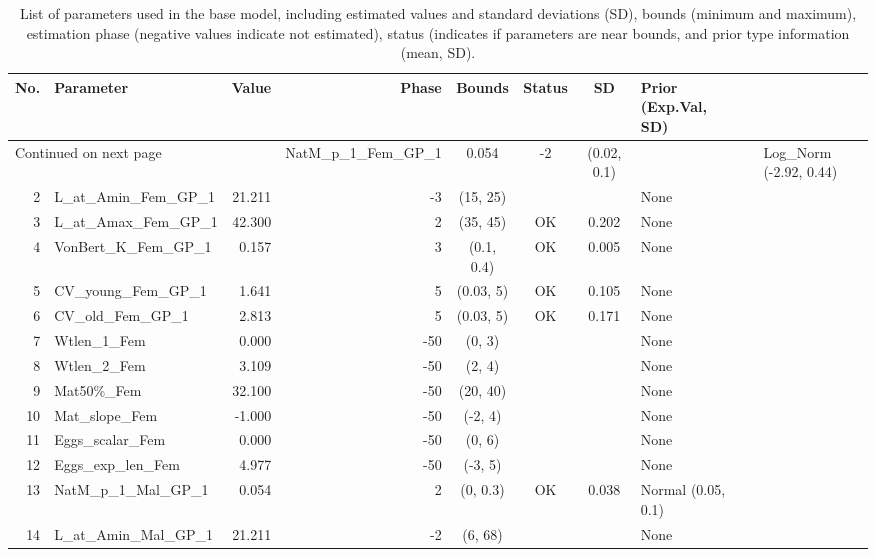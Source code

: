 \documentclass[12pt,]{article}
\begin{document}
\begin{landscape}
\begin{longtable}{rlrrcccl}
\caption{List of parameters used in
                                              the base model, including estimated 
                                              values and standard deviations (SD), 
                                              bounds (minimum and maximum), 
                                              estimation phase (negative values indicate
                                              not estimated), status (indicates if 
                                              parameters are near bounds, and prior type
                                              information (mean, SD).} \\ 
  \hline
No. & Parameter & Value & Phase & Bounds & Status & SD & Prior (Exp.Val, SD)  \\ 
  \hline 
\endhead 
\hline 
\multicolumn{3}{l}{\footnotesize Continued on next page} 
\endfoot 
\endlastfoot 
 \hline
1 & NatM\_p\_1\_Fem\_GP\_1 & 0.054 & -2 & (0.02, 0.1) &  &  & Log\_Norm (-2.92, 0.44) \\ 
  2 & L\_at\_Amin\_Fem\_GP\_1 & 21.211 & -3 & (15, 25) &  &  & None \\ 
  3 & L\_at\_Amax\_Fem\_GP\_1 & 42.300 & 2 & (35, 45) & OK & 0.202 & None \\ 
  4 & VonBert\_K\_Fem\_GP\_1 & 0.157 & 3 & (0.1, 0.4) & OK & 0.005 & None \\ 
  5 & CV\_young\_Fem\_GP\_1 & 1.641 & 5 & (0.03, 5) & OK & 0.105 & None \\ 
  6 & CV\_old\_Fem\_GP\_1 & 2.813 & 5 & (0.03, 5) & OK & 0.171 & None \\ 
  7 & Wtlen\_1\_Fem & 0.000 & -50 & (0, 3) &  &  & None \\ 
  8 & Wtlen\_2\_Fem & 3.109 & -50 & (2, 4) &  &  & None \\ 
  9 & Mat50\%\_Fem & 32.100 & -50 & (20, 40) &  &  & None \\ 
  10 & Mat\_slope\_Fem & -1.000 & -50 & (-2, 4) &  &  & None \\ 
  11 & Eggs\_scalar\_Fem & 0.000 & -50 & (0, 6) &  &  & None \\ 
  12 & Eggs\_exp\_len\_Fem & 4.977 & -50 & (-3, 5) &  &  & None \\ 
  13 & NatM\_p\_1\_Mal\_GP\_1 & 0.054 & 2 & (0, 0.3) & OK & 0.038 & Normal (0.05, 0.1) \\ 
  14 & L\_at\_Amin\_Mal\_GP\_1 & 21.211 & -2 & (6, 68) &  &  & None \\ 

\end{longtable}
\end{landscape}
\end{document}
